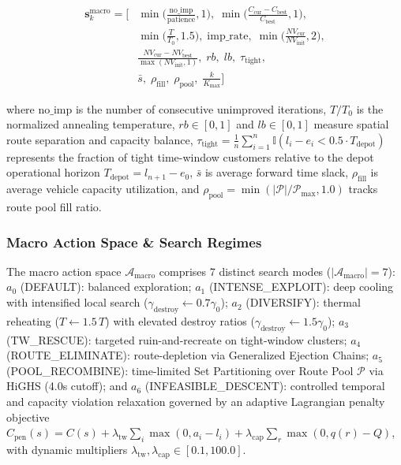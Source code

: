 \documentclass{ieeeaccess}
\begin{document}
\begin{align}
  \mathbf{s}_k^{\text{macro}} = \Big[ 
    &\min\Big(\frac{\text{no\_imp}}{\text{patience}}, 1\Big), \; \min\Big(\frac{C_{\text{cur}} - C_{\text{best}}}{C_{\text{best}}}, 1\Big), \nonumber \\
    &\min\Big(\frac{T}{T_0}, 1.5\Big), \; \text{imp\_rate}, \; \min\Big(\frac{NV_{\text{cur}}}{NV_{\text{init}}}, 2\Big), \nonumber \\
    &\frac{NV_{\text{cur}} - NV_{\text{best}}}{\max(NV_{\text{init}}, 1)}, \; rb, \; lb, \; \tau_{\text{tight}}, \nonumber \\
    &\bar{s}, \; \rho_{\text{fill}}, \; \rho_{\text{pool}}, \; \frac{k}{K_{\max}} \Big]
  \label{eq:macro_state}
\end{align}

where $\text{no\_imp}$ is the number of consecutive unimproved iterations, $T/T_0$ is the normalized annealing temperature, $rb \in [0, 1]$ and $lb \in [0, 1]$ measure spatial route separation and capacity balance, $\tau_{\text{tight}} = \frac{1}{n}\sum_{i=1}^n \mathbb{I}(l_i - e_i < 0.5 \cdot T_{\text{depot}})$ represents the fraction of tight time-window customers relative to the depot operational horizon $T_{\text{depot}} = l_{n+1} - e_0$, $\bar{s}$ is average forward time slack, $\rho_{\text{fill}}$ is average vehicle capacity utilization, and $\rho_{\text{pool}} = \min(|\mathcal{P}|/\mathcal{P}_{\max}, 1.0)$ tracks route pool fill ratio.

\subsubsection{Macro Action Space \& Search Regimes}
The macro action space $\mathcal{A}_{\text{macro}}$ comprises 7 distinct search modes ($|\mathcal{A}_{\text{macro}}| = 7$): $a_0$ (\textsf{\small DEFAULT}): balanced exploration; $a_1$ (\textsf{\small INTENSE\_EXPLOIT}): deep cooling with intensified local search ($\gamma_{\text{destroy}} \leftarrow 0.7\gamma_0$); $a_2$ (\textsf{\small DIVERSIFY}): thermal reheating ($T \leftarrow 1.5\,T$) with elevated destroy ratios ($\gamma_{\text{destroy}} \leftarrow 1.5\gamma_0$); $a_3$ (\textsf{\small TW\_RESCUE}): targeted ruin-and-recreate on tight-window clusters; $a_4$ (\textsf{\small ROUTE\_ELIMINATE}): route-depletion via Generalized Ejection Chains; $a_5$ (\textsf{\small POOL\_RECOMBINE}): time-limited Set Partitioning over Route Pool $\mathcal{P}$ via HiGHS (4.0s cutoff); and $a_6$ (\textsf{\small INFEASIBLE\_DESCENT}): controlled temporal and capacity violation relaxation governed by an adaptive Lagrangian penalty objective $C_{\text{pen}}(s) = C(s) + \lambda_{\text{tw}} \sum_{i} \max(0, a_i - l_i) + \lambda_{\text{cap}} \sum_{r} \max(0, q(r) - Q)$, with dynamic multipliers $\lambda_{\text{tw}}, \lambda_{\text{cap}} \in [0.1, 100.0]$.
\end{document}
